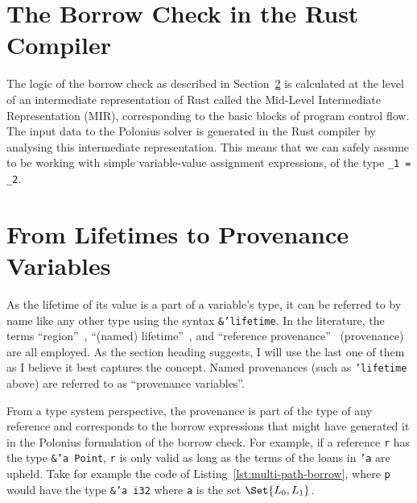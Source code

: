 \documentclass[11pt,a4paper,twoside,openany]{report}
\newcommand{\fixme}[1] {{\color{red}#1}}
\newcommand{\InRust}[1]{\texttt{#1}}
\begin{document}
\section{The Borrow Check in the Rust Compiler}
\label{sec:rust-specificts}

The logic of the borrow check as described in
Section~\ref{sec:reference-provenance} is calculated at the level of an
intermediate representation of Rust called the Mid-Level Intermediate
Representation (MIR), corresponding to the basic blocks of program control flow.
The input data to the Polonius solver is generated in the Rust compiler by
analysing this intermediate representation. This means that we can safely assume
to be working with simple variable-value assignment expressions, of the type
\InRust{_1 = _2}.


\section{From Lifetimes to Provenance Variables}
\label{sec:reference-provenance}

As the lifetime of its value is a part of a variable's type, it can be referred
to by name like any other type using the syntax \InRust{&'lifetime}. In the
literature, the terms ``region''~\cite{matsakis_alias-based_2018}, ``(named)
lifetime''~\nocite{noauthor_rfc_2019}, and ``reference
provenance''~\cite{weiss_oxide:_2019} (provenance) are all employed. As the
section heading suggests, I will use the last one of them as I believe it best
captures the concept. Named provenances (such as \InRust{'lifetime} above) are
referred to as ``provenance variables''.

From a type system perspective, the provenance is part of the type of any
reference and corresponds to the borrow expressions that might have generated it
in the Polonius formulation of the borrow check. For example, if a reference
\InRust{r} has the type \InRust{&'a Point}, \InRust{r} is only valid as long as
the terms of the loans in \InRust{'a} are upheld. Take for example the code of
Listing~\ref{lst:multi-path-borrow}, where \InRust{p} would have the type
\InRust{&'a i32} where \InRust{a} is the set $\Set{L_0, L_1}$.
\end{document}
